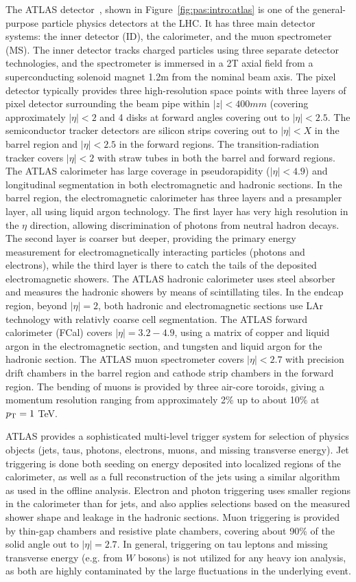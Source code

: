 The ATLAS detector~\cite{Aad:2008zzm}, shown in Figure~\ref{fig:pas:intro:atlas} is one of the general-purpose particle physics
detectors at the LHC.
It has three main detector systems: the inner detector (ID), the calorimeter,
and the muon spectrometer (MS).
%
The inner detector tracks charged particles using three separate detector
technologies, and the spectrometer is immersed in a 2T axial field from a
superconducting solenoid magnet 1.2m from the nominal beam axis.
The pixel detector typically provides three high-resolution space points
with three layers of pixel detector surrounding the beam pipe within
$|z|<400 mm$ (covering approximately $|\eta|<2$ and 4 disks at forward
angles covering out to $|\eta|<2.5$.
The semiconductor tracker detectors are silicon strips covering out to
$|\eta|<X$ in the barrel region and $|\eta|<2.5$ in the forward regions.
The transition-radiation tracker covers $|\eta|<2$ with straw tubes in
both the barrel and forward regions.
%
The ATLAS calorimeter has large coverage in pseudorapidity ($|\eta|<4.9$)
and longitudinal segmentation in both electromagnetic and hadronic
sections.
In the barrel region, the electromagnetic calorimeter has three
layers and a presampler layer, all using liquid argon technology.
The first layer has very high resolution
in the $\eta$ direction, allowing discrimination of photons from
neutral hadron decays.
The second layer is coarser but deeper, providing the primary energy
measurement for electromagnetically interacting particles (photons and
electrons), while the third layer is there to catch the tails of the
deposited electromagnetic showers.
%
The ATLAS hadronic calorimeter uses steel absorber and measures the
hadronic showers by means of scintillating tiles.
In the endcap region, beyond $|\eta|=2$,
both hadronic and electromagnetic sections use LAr technology with
relativly coarse cell segmentation.
The ATLAS forward calorimeter (FCal) covers $|\eta|=3.2-4.9$, using
a matrix of copper and liquid argon in the electromagnetic section,
and tungsten and liquid argon for the hadronic section.
%
The ATLAS muon spectrometer covers $|\eta|<2.7$ with precision drift
chambers
in the barrel region and cathode strip chambers in the forward region.
The bending of muons is provided by three air-core toroids, giving
a momentum resolution ranging from approximately 2\% up to about
10\% at $\mbox{$p_{\mathrm{T}}$}=1$ TeV.
%

ATLAS provides a sophisticated multi-level trigger system for
selection of physics objects (jets, taus, photons, electrons, muons,
and missing transverse energy).
Jet triggering is done both seeding on energy deposited into localized
regions of the calorimeter, as well as a full reconstruction of the jets
using a similar algorithm as used in the offline analysis.
Electron and photon triggering uses smaller regions in the calorimeter
than for jets, and also applies selections based on the measured shower
shape and leakage in the hadronic sections.
Muon triggering is provided by thin-gap chambers and resistive plate chambers,
covering about 90\% of the solid angle out to $|\eta|=2.7$.
In general, triggering on tau leptons and missing transverse energy (e.g.
from $W$ bosons) is not utilized for any heavy ion analysis, as both
are highly contaminated by the large fluctuations in the
underlying event.

